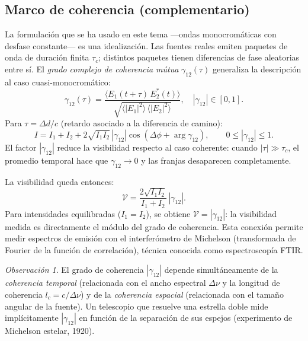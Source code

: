 \documentclass[12pt, a4paper]{article}
\theoremstyle{plain}
\theoremstyle{definition}
\theoremstyle{remark}
\newtheorem*{observacion}{Observación}
\begin{document}
\subsection{Marco de coherencia (complementario)}

La formulación que se ha usado en este tema —ondas monocromáticas con desfase
constante— es una idealización. Las fuentes reales emiten paquetes de onda de
duración finita $\tau_c$; distintos paquetes tienen diferencias de fase
aleatorias entre sí. El \emph{grado complejo de coherencia mútua}
$\gamma_{12}(\tau)$ generaliza la descripción al caso cuasi-monocromático:
\begin{equation}
  \gamma_{12}(\tau)
  = \frac{\langle E_1(t+\tau)\,E_2^*(t)\rangle}
         {\sqrt{\langle|E_1|^2\rangle\,\langle|E_2|^2\rangle}},
  \quad |\gamma_{12}| \in [0,1].
\end{equation}
Para $\tau = \Delta d/c$ (retardo asociado a la diferencia de camino):
\begin{equation}
  I=I_1+I_2+2\sqrt{I_1I_2}\,|\gamma_{12}|\cos(\Delta\phi+\arg\gamma_{12}),
  \qquad 0\le|\gamma_{12}|\le 1.
  \label{eq:gamma_interferencia_t6}
\end{equation}
El factor $|\gamma_{12}|$ reduce la visibilidad respecto al caso coherente:
cuando $|\tau| \gg \tau_c$, el promedio temporal hace que $\gamma_{12} \to 0$
y las franjas desaparecen completamente.

La visibilidad queda entonces:
\begin{equation}
  \mathcal{V}
  =\frac{2\sqrt{I_1I_2}}{I_1+I_2}\,|\gamma_{12}|.
  \label{eq:vis_gamma_t6}
\end{equation}
Para intensidades equilibradas ($I_1=I_2$), se obtiene
$\mathcal{V}=|\gamma_{12}|$: la visibilidad medida es directamente el módulo
del grado de coherencia. Esta conexión permite medir espectros de emisión
con el interferómetro de Michelson (transformada de Fourier de la función de
correlación), técnica conocida como espectroscopía FTIR.

\begin{observacion}
El grado de coherencia $|\gamma_{12}|$ depende simultáneamente de la
\emph{coherencia temporal} (relacionada con el ancho espectral $\Delta\nu$
y la longitud de coherencia $l_c = c/\Delta\nu$) y de la \emph{coherencia
espacial} (relacionada con el tamaño angular de la fuente). Un telescopio
que resuelve una estrella doble mide implícitamente $|\gamma_{12}|$ en
función de la separación de sus espejos (experimento de Michelson estelar,
1920).
\end{observacion}
\end{document}
